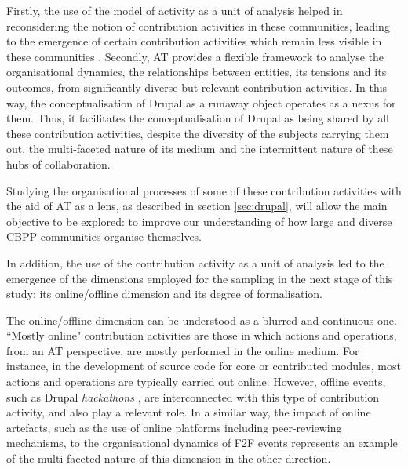 \documentclass[a4paper, 12pt]{article}
\begin{document}
Firstly, the use of the model of activity as a unit of analysis helped in reconsidering the notion of contribution activities in these communities, leading to the emergence of certain contribution activities which remain less visible in these communities \parencite{rozas2015}. Secondly, AT provides a flexible framework to analyse the organisational dynamics, the relationships between entities, its tensions and its outcomes, from significantly diverse but relevant contribution activities. In this way, the conceptualisation of Drupal as a runaway object operates as a nexus for them. Thus, it facilitates the conceptualisation of Drupal as being shared by all these contribution activities, despite the diversity of the subjects carrying them out, the multi-faceted nature of its medium and the intermittent nature of these hubs of collaboration.

Studying the organisational processes of some of these contribution activities with the aid of AT as a lens, as described in section \ref{sec:drupal}, will allow the main objective to be explored: to improve our understanding of how large and diverse CBPP communities organise themselves.

In addition, the use of the contribution activity as a unit of analysis led to the emergence of the dimensions employed for the sampling in the next stage of this study: its online\slash offline dimension and its degree of formalisation.

The online\slash offline dimension can be understood as a blurred and continuous one. ``Mostly online" contribution activities are those in which actions and operations, from an AT perspective, are mostly performed in the online medium. For instance, in the development of source code for core or contributed modules, most actions and operations are typically carried out online. However, offline events, such as Drupal \textit{hackathons} \parencite{lapp20072006}, are interconnected with this type of contribution activity, and also play a relevant role. In a similar way, the impact of online artefacts, such as the use of online platforms including peer-reviewing mechanisms, to the organisational dynamics of F2F events represents an example of the multi-faceted nature of this dimension in the other direction.
\end{document}
